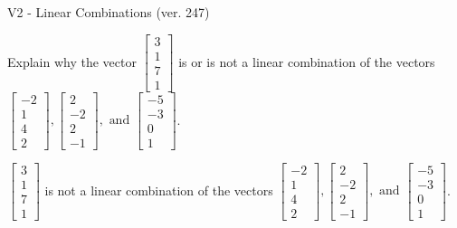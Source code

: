 \begin{exercise}
  \begin{exerciseTitle}V2 - Linear Combinations (ver. 247)\end{exerciseTitle}
  \begin{exerciseStatement}
    Explain why the vector \(\left[\begin{array}{c}
3 \\
1 \\
7 \\
1
\end{array}\right]\)  is or is not a linear 
	combination of the vectors \(\left[\begin{array}{c}
-2 \\
1 \\
4 \\
2
\end{array}\right] , \left[\begin{array}{c}
2 \\
-2 \\
2 \\
-1
\end{array}\right] , \text{ and } \left[\begin{array}{c}
-5 \\
-3 \\
0 \\
1
\end{array}\right]\).
	


  \end{exerciseStatement}
  \begin{exerciseAnswer}
   \(\left[\begin{array}{c}
3 \\
1 \\
7 \\
1
\end{array}\right]\) 
  	 is not  
	a linear combination of the vectors \(\left[\begin{array}{c}
-2 \\
1 \\
4 \\
2
\end{array}\right] , \left[\begin{array}{c}
2 \\
-2 \\
2 \\
-1
\end{array}\right] , \text{ and } \left[\begin{array}{c}
-5 \\
-3 \\
0 \\
1
\end{array}\right]\).

	
  


  \end{exerciseAnswer}
\end{exercise}